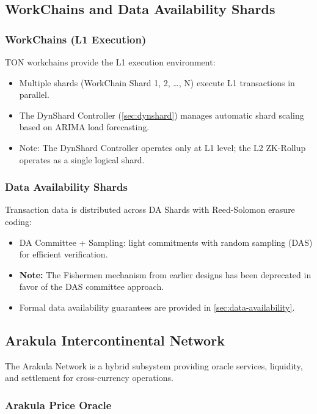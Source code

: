 \documentclass[12pt,a4paper]{article}
\theoremstyle{definition}
\theoremstyle{remark}
\begin{document}
\subsection{WorkChains and Data Availability Shards}
\label{sec:workchains-da}

\subsubsection{WorkChains (L1 Execution)}

TON workchains provide the L1 execution environment:
\begin{itemize}[nosep]
    \item Multiple shards (WorkChain Shard 1, 2, \ldots, N) execute L1 transactions in parallel.
    \item The DynShard Controller (\cref{sec:dynshard}) manages automatic shard scaling based on ARIMA load forecasting.
    \item Note: The DynShard Controller operates only at L1 level; the L2 ZK-Rollup operates as a single logical shard.
\end{itemize}

\subsubsection{Data Availability Shards}

Transaction data is distributed across DA Shards with Reed-Solomon erasure coding:
\begin{itemize}[nosep]
    \item DA Committee + Sampling: light commitments with random sampling (DAS) for efficient verification.
    \item \textbf{Note:} The Fishermen mechanism from earlier designs has been deprecated in favor of the DAS committee approach.
    \item Formal data availability guarantees are provided in \cref{sec:data-availability}.
\end{itemize}

\subsection{Arakula Intercontinental Network}
\label{sec:arakula-network}

The Arakula Network is a hybrid subsystem providing oracle services, liquidity, and settlement for cross-currency operations.

\subsubsection{Arakula Price Oracle}
\end{document}
